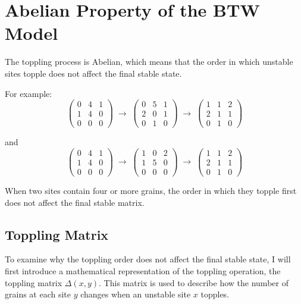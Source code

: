 \chapter{Abelian Property of the BTW Model}\label{ch:Abelian}


The toppling process is Abelian, which means that the order in which unstable sites topple does not affect the final stable state.

For example:
\[
\begin{pmatrix}
	0 & 4 & 1 \\
	1 & 4 & 0 \\
	0 & 0 & 0
\end{pmatrix}
\;\rightarrow\;
\begin{pmatrix}
	0 & 5 & 1 \\
	2 & 0 & 1 \\
	0 & 1 & 0
\end{pmatrix}
\;\rightarrow\;
\begin{pmatrix}
	1 & 1 & 2 \\
	2 & 1 & 1 \\
	0 & 1 & 0
\end{pmatrix}
\]

and 
\[
\begin{pmatrix}
	0 & 4 & 1 \\
	1 & 4 & 0 \\
	0 & 0 & 0
\end{pmatrix}
\;\rightarrow\;
\begin{pmatrix}
	1 & 0 & 2 \\
	1 & 5 & 0 \\
	0 & 0 & 0
\end{pmatrix}
\;\rightarrow\;
\begin{pmatrix}
	1 & 1 & 2 \\
	2 & 1 & 1 \\
	0 & 1 & 0
\end{pmatrix}
\]

When two sites contain four or more grains, the order in which they topple first does not affect the final stable matrix.

\section{Toppling Matrix}
To examine why the toppling order does not affect the final stable state, I will first introduce a mathematical representation of the toppling operation, the toppling matrix $\Delta (x,y)$. This matrix is used to describe how the number of grains at each site $y$ changes when an unstable site $x$ topples.

